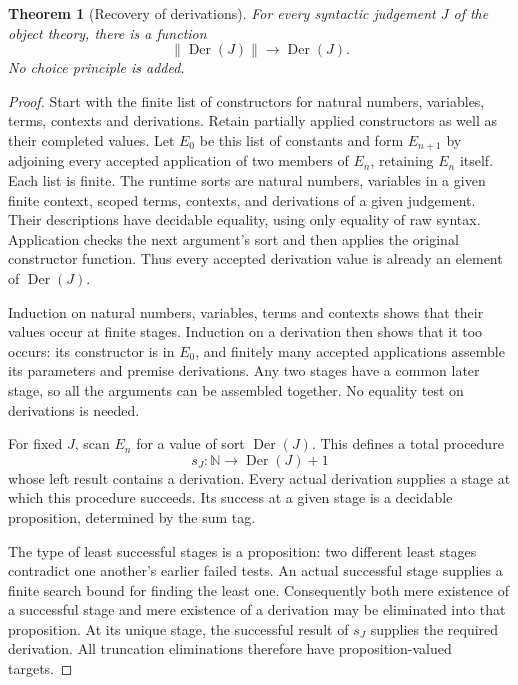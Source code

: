 \documentclass[11pt,a4paper]{article}
\newtheorem{theorem}{Theorem}[section]
\theoremstyle{definition}
\theoremstyle{remark}
\newcommand{\N}{\mathbb N}
\newcommand{\trunc}[1]{\left\lVert #1\right\rVert}
\begin{document}
\begin{theorem}[Recovery of derivations]\label{thm:derivation-recovery}
For every syntactic judgement $J$ of the object theory, there is a function
\[
 \trunc{\operatorname{Der}(J)}\longrightarrow\operatorname{Der}(J).
\]
No choice principle is added.
\end{theorem}
\begin{proof}
Start with the finite list of constructors for natural numbers, variables,
terms, contexts and derivations. Retain partially applied constructors as
well as their completed values. Let $E_0$ be this list of constants and
form $E_{n+1}$ by adjoining every accepted application of two members of
$E_n$, retaining $E_n$ itself. Each list is finite. The runtime sorts are
natural numbers, variables in a given finite context, scoped terms,
contexts, and derivations of a given judgement. Their descriptions have
decidable equality, using only equality of raw syntax. Application checks the next
argument's sort and then applies the original constructor function.
Thus every accepted derivation value is already an element of
$\operatorname{Der}(J)$.

Induction on natural numbers, variables, terms and contexts shows that
their values occur at finite stages. Induction on a derivation then shows
that it too occurs: its constructor is in $E_0$, and finitely many accepted
applications assemble its parameters and premise derivations. Any two
stages have a common later stage, so all the arguments can be assembled
together. No equality test on derivations is needed.

For fixed $J$, scan $E_n$ for a value of sort $\operatorname{Der}(J)$.
This defines a total procedure
\[
 s_J:\N\longrightarrow\operatorname{Der}(J)+1
\]
whose left result contains a derivation. Every actual derivation supplies
a stage at which this procedure succeeds. Its success at a given stage
is a decidable proposition, determined by the sum tag.

The type of least successful stages is a proposition: two different
least stages contradict one another's earlier failed tests. An actual
successful stage supplies a finite search bound for finding the least one.
Consequently both mere existence of a successful stage and mere existence
of a derivation may be eliminated into that proposition. At its unique
stage, the successful result of $s_J$ supplies the required derivation.
All truncation eliminations therefore have proposition-valued targets.
\end{proof}
\end{document}
